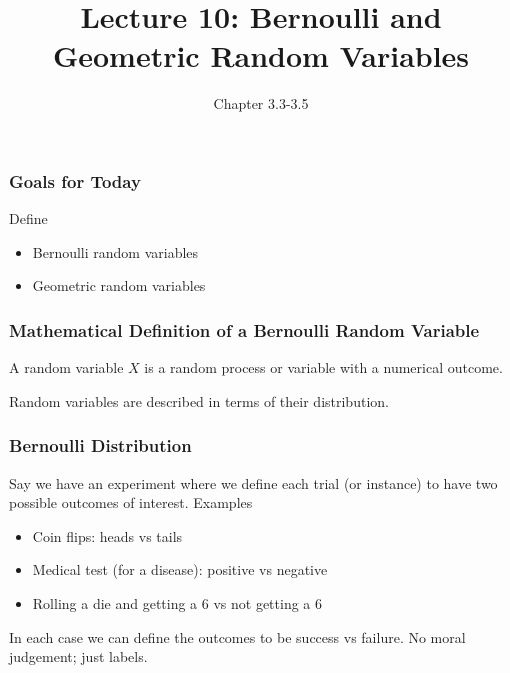 \documentclass[slides]{beamer}
\title{Lecture 10: Bernoulli and Geometric Random Variables}
\author{Chapter 3.3-3.5}
\date{}
\newcommand{\blue}[1]{\textcolor{blue2}{#1}}
\begin{document}
\begin{frame}
\titlepage
\end{frame}



\begin{frame}[fragile]
\frametitle{Goals for Today}

Define
\begin{itemize}
\item Bernoulli random variables
\item Geometric random variables
\end{itemize}


\end{frame}


\begin{frame}[fragile]
\frametitle{Mathematical Definition of a Bernoulli Random Variable}

A \blue{random variable $X$} is a random process or variable with a numerical outcome.  

\vspace{5cm}

\pause Random variables are described in terms of their \blue{distribution}.
\end{frame}


\begin{frame}
\frametitle{Bernoulli Distribution}
Say we have an experiment where we define each \blue{trial} (or instance) to have two possible outcomes of interest.  Examples
\pause\begin{itemize}
\item Coin flips:  heads vs tails
\item Medical test (for a disease):  positive vs negative
\item Rolling a die and getting a 6 vs not getting a 6
\end{itemize}

\vspace{0.5cm}

\pause In each case we can \blue{define} the outcomes to be \blue{success} vs \blue{failure}.  No moral judgement; just labels.

\end{frame}
\end{document}
